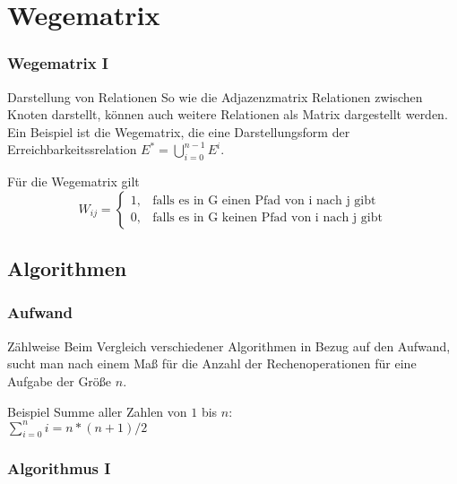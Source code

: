 \section{Wegematrix}
\begin{frame}
	\frametitle{Wegematrix I}
	\begin{block}{Darstellung von Relationen}
		So wie die Adjazenzmatrix Relationen zwischen Knoten darstellt, können auch weitere Relationen als Matrix dargestellt werden. Ein Beispiel ist die Wegematrix, die eine Darstellungsform der Erreichbarkeitssrelation
		$E^*=\bigcup^{n-1}_{i=0} E^i $. \\
	\end{block}
	\begin{block}{Für die Wegematrix gilt}
 \begin{displaymath}
 W_{ij}=
	\begin{cases}
		1, & \text{falls es in G einen Pfad von i nach j gibt} \\
		0, & \text{falls es in G keinen Pfad von i nach j gibt}
	\end{cases}
	\end{displaymath}
	\end{block}
\end{frame}

\subsection{Algorithmen}
\begin{frame}
	\frametitle{Aufwand}
	\begin{block}{Zählweise}
		Beim Vergleich verschiedener Algorithmen in Bezug auf den Aufwand, sucht man nach einem Maß für die Anzahl der Rechenoperationen für eine Aufgabe der Größe $n$.
	\end{block}
	\begin{block}{Beispiel} \pause
		Summe aller Zahlen von $1$ bis $n$: \\

			$\sum^n_{i=0} i = $\pause$n*(n+1)/2$

	\end{block}
\end{frame}

\begin{frame}
	\frametitle{Algorithmus I}



\end{frame}


